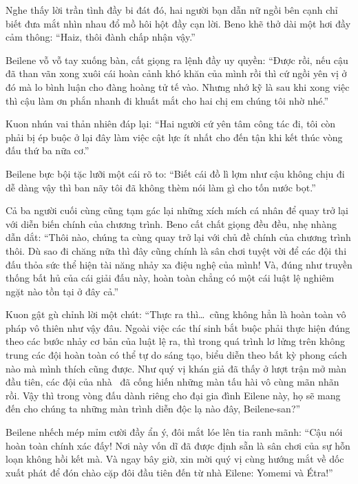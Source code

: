 \documentclass[../main.tex]{subfiles}
\begin{document}
Nghe thấy lời trần tình đầy bi đát đó, hai người bạn dẫn nữ ngồi bên cạnh chỉ biết đưa mắt nhìn nhau đổ mồ hôi hột đầy cạn lời. Beno khẽ thở dài một hơi đầy cảm thông: ``Haiz, thôi đành chấp nhận vậy.''

Beilene vỗ vỗ tay xuống bàn, cất giọng ra lệnh đầy uy quyền: ``Được rồi, nếu cậu đã than vãn xong xuôi cái hoàn cảnh khó khăn của mình rồi thì cứ ngồi yên vị ở đó mà lo bình luận cho đàng hoàng tử tế vào. Nhưng nhớ kỹ là sau khi xong việc thì cậu làm ơn phắn nhanh đi khuất mắt cho hai chị em chúng tôi nhờ nhé.''

Kuon nhún vai thản nhiên đáp lại: ``Hai người cứ yên tâm công tác đi, tôi còn phải bị ép buộc ở lại đây làm việc cật lực ít nhất cho đến tận khi kết thúc vòng đấu thứ ba nữa cơ.''

Beilene bực bội tặc lưỡi một cái rõ to: ``Biết cái đồ lì lợm như cậu không chịu đi dễ dàng vậy thì ban nãy tôi đã không thèm nói làm gì cho tốn nước bọt.''

Cả ba người cuối cùng cũng tạm gác lại những xích mích cá nhân để quay trở lại với diễn biến chính của chương trình. Beno cất chất giọng đều đều, nhẹ nhàng dẫn dắt: ``Thôi nào, chúng ta cùng quay trở lại với chủ đề chính của chương trình thôi. Dù sao đi chăng nữa thì đây cũng chính là sân chơi tuyệt vời để các đội thi đấu thỏa sức thể hiện tài năng nhảy xa điệu nghệ của mình! Và, đúng như truyền thống bất hủ của cái giải đấu này, hoàn toàn chẳng có một cái luật lệ nghiêm ngặt nào tồn tại ở đây cả.''

Kuon gật gù chỉnh lời một chút: ``Thực ra thì\dots\ cũng không hẳn là hoàn toàn vô pháp vô thiên như vậy đâu. Ngoài việc các thí sinh bắt buộc phải thực hiện đúng theo các bước nhảy cơ bản của luật lệ ra, thì trong quá trình lơ lửng trên không trung các đội hoàn toàn có thể tự do sáng tạo, biểu diễn theo bất kỳ phong cách nào mà mình thích cũng được. Như quý vị khán giả đã thấy ở lượt trận mở màn đầu tiên, các đội của nhà \hll\ đã cống hiến những màn tấu hài vô cùng mãn nhãn rồi. Vậy thì trong vòng đấu dành riêng cho đại gia đình Eilene này, họ sẽ mang đến cho chúng ta những màn trình diễn độc lạ nào đây, Beilene-san?''

Beilene nhếch mép mỉm cười đầy ẩn ý, đôi mắt lóe lên tia ranh mãnh: ``Cậu nói hoàn toàn chính xác đấy! Nơi này vốn dĩ đã được định sẵn là sân chơi của sự hỗn loạn không hồi kết mà. Và ngay bây giờ, xin mời quý vị cùng hướng mắt về dốc xuất phát để đón chào cặp đôi đầu tiên đến từ nhà Eilene: Yomemi và Étra!''

\subsubsection*{\label{ep-003.IV}}
\end{document}
